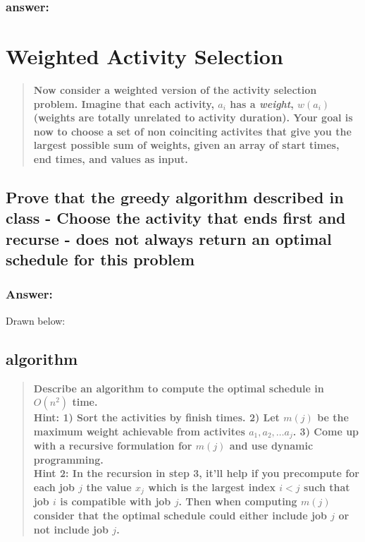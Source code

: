 \documentclass[titlepage]{article}\usepackage[]{graphicx}\usepackage[]{color}
\begin{document}
\subsubsection{answer:}
\vspace{7 cm}

\section{Weighted Activity Selection}
\begin{quote}
  \textbf{ Now consider a weighted version of the activity selection problem. Imagine
	that each activity, $a_i$ has a \textit{weight}, $w(a_i)$ (weights are
	totally unrelated to activity duration). Your goal is now to choose a set of
	non coinciting activites that give you the largest possible sum of weights,
  given an array of start times, end times, and values as input.}
\end{quote}

\subsection{Prove that the greedy algorithm described in class - Choose the
  activity that ends first and recurse - does not always return an optimal
schedule for this problem}
\subsubsection{Answer: }
Drawn below:
\vspace{7 cm}


\subsection{algorithm}
  
\begin{quote}
  
  \textbf{Describe an algorithm to compute the optimal schedule in $O(n^2)$
  time. \\
  Hint: 1) Sort the activities by finish times. 2) Let $m(j)$ be the
  maximum weight achievable from activites $a_1, a_2, \dots a_j$. 3) Come up
  with a recursive formulation for $m(j)$ and use dynamic programming. \\
  Hint 2:
  In the recursion in step 3, it'll help if you precompute for each job $j$ the
  value $x_j$ which is the largest index $i < j$ such that job $i$ is
  compatible with job $j$. Then when computing $m(j)$ consider that the optimal
schedule could either include job $j$ or not include job $j$.}
\end{quote}
\end{document}
